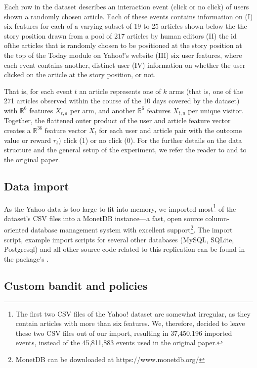 \documentclass{jss}
\begin{document}
Each row in the dataset describes an interaction event (click or no click) of users shown a randomly chosen article. Each of these events contains information on (I) six features for each of a varying subset of 19 to 25 articles shown below the the story position drawn from a pool of 217 articles by human editors (II) the id ofthe articles that is randomly chosen to be positioned at the story position at the top of the Today module on Yahoo!'s website (III) six user features, where each event contains another, distinct user (IV) information on whether the user clicked on the article at the story position, or not.

That is, for each event $t$ an article represents one of $k$ arms (that is, one of the 271 articles observed within the course of the 10 days covered by the dataset) with $\mathbb{R}^6$ features $X_{t,a}$ per arm, and another $\mathbb{R}^6$ features $X_{t,u}$ per unique visitor. Together, the flattened outer product of the user and article feature vector creates a $\mathbb{R}^{36}$ feature vector $X_t$ for each user and article pair with the outcome value or reward $r_t$) click (1) or no click (0). For the further details on the data structure and the general setup of the experiment, we refer the reader to \cite{Chu2009} and to the original \cite{Li2010} paper.

\subsection{Data import} \label{dataimp}

As the Yahoo data is too large to fit into memory, we imported most\footnote{The first two CSV files of the Yahoo! dataset are somewhat irregular, as they contain articles with more than six features. We, therefore, decided to leave these two CSV files out of our import, resulting in 37,450,196 imported events, instead of the 45,811,883 events used in the original paper.} of the dataset's CSV files into a MonetDB \citep{IdreosGNMMK12} instance---a fast, open source column-oriented database management system with excellent  support\footnote{MonetDB can be downloaded at https://www.monetdb.org/}. The import script, example import scripts for several other databases (MySQL, SQLite, Postgresql) and all other source code related to this replication can be found in the package's .

\subsection{Custom bandit and policies} \label{custom}
\end{document}

